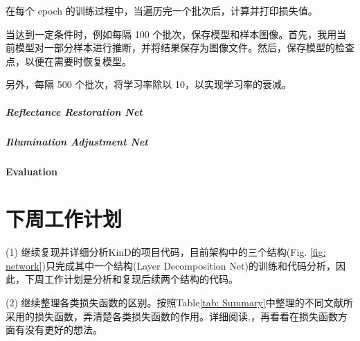 \documentclass[letterpaper,12pt]{article}
\begin{document}
	在每个 epoch 的训练过程中，当遍历完一个批次后，计算并打印损失值。
	
	当达到一定条件时，例如每隔 100 个批次，保存模型和样本图像。首先，我用当前模型对一部分样本进行推断，并将结果保存为图像文件。然后，保存模型的检查点，以便在需要时恢复模型。
	
	另外，每隔 500 个批次，将学习率除以 10，以实现学习率的衰减。
	
	\subparagraph{Reflectance Restoration Net}
	
	\subparagraph{Illumination Adjustment Net}
	
	\paragraph{Evaluation}
	
		
		
	
	
	\section{下周工作计划}
	
	(1) 继续复现并详细分析KinD的项目代码，目前架构中的三个结构(Fig. \ref{fig: network})只完成其中一个结构(Layer Decomposition Net)的训练和代码分析，因此，下周工作计划是分析和复现后续两个结构的代码。
	
	(2) 继续整理各类损失函数的区别。按照Table\ref{tab: Summary}中整理的不同文献所采用的损失函数，弄清楚各类损失函数的作用。详细阅读\cite{fang2020perceptual},\cite{talebi2018nima}，再看看在损失函数方面有没有更好的想法。
	
	
	
	
\end{document}
